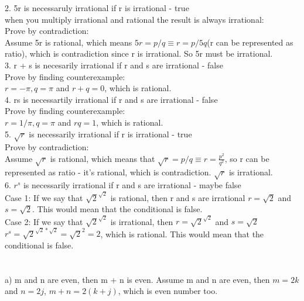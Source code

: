 \documentclass{article}
\begin{document}
2. 5r is necessaruly irrational if r is irrational - true\\
when you multiply irrational and rational the result is always irrational:\\
Prove by contradiction:\\
Assume 5r is rational, which means $5r = p/q \equiv r = p/5q$(r can be represented as ratio), which is contradiction since r is irrational. So 5r must be irrational.\\

3. r + s is necesarily irrational if r and s are irrational - false\\
Prove by finding counterexample:\\
$r = -\pi, q = \pi$ and $r + q = 0$, which is rational.\\

4. rs is necessartily irrational if r and s are irrational - false\\
Prove by finding counterexample:\\
$r = 1/\pi, q = \pi$ and $rq = 1$, which is rational.\\

5. $\sqrt{r}$ is necessarily irrational if r is irrational - true\\
Prove by contradiction:\\
Assume $\sqrt{r}$ is rational, which means that $\sqrt{r} = p/q \equiv r = \frac{p^2}{q^2}$, so r can be represented as ratio - it's rational, which is contradiction. $\sqrt{r}$ is irrational.\\

6. $r^s$ is necessarily irrational if r and s are irrational - maybe false\\
Case 1: If we say that $\sqrt{2}^{\sqrt{2}}$ is rational, then r and s are irrational  $r = \sqrt{2}$ and $s = \sqrt{2}$. This would mean that the conditional is false.\\
Case 2: If we say that $\sqrt{2}^{\sqrt{2}}$ is irrational, then $r = \sqrt{2}^{\sqrt{2}}$ and $s = \sqrt{2}$\\
$r^s = \sqrt{2}^{\sqrt{2}*\sqrt{2}} = \sqrt{2}^2 = 2$, which is rational. This would mean that the conditional is false. 


\section{}
a) m and n are even, then m + n is even.
Assume m and n are even, then $m = 2k$ and $n = 2j$, $m + n = 2(k + j)$, which is even number too.\\
\end{document}
